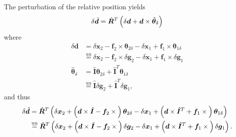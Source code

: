 \documentclass[10pt,fleqn,subeqn]{report}
\newcommand{\T}[1]{\bm{#1}}
\newcommand{\TT}[1]{\bm{#1}}
\newcommand{\equu}{\overset{\text{uu}}{=}}
\begin{document}
The perturbation of the relative position yields
\begin{equation}
	\delta\tilde{\T{d}} = \hat{\TT{R}}^T \plbr{
		\delta\T{d} + \T{d} \times \hat{\T{\theta}}_{\delta}
	}
\end{equation}
where
\begin{subequations}
\begin{align}
	\delta\T{d}
	&= \delta\T{x}_2 - \T{f}_2 \times \T{\theta}_{2\delta}
		- \delta\T{x}_1 + \T{f}_1 \times \T{\theta}_{1\delta}
		\nonumber \\
	&\equu \delta\T{x}_2 - \T{f}_2 \times \delta\T{g}_2
		- \delta\T{x}_1 + \T{f}_1 \times \delta\T{g}_1
	\\
	\hat{\T{\theta}}_{\delta}
	&= \hat{\TT{I}} \T{\theta}_{2\delta} + \hat{\TT{I}}^T \T{\theta}_{1\delta}
		\nonumber \\
	&\equu \hat{\TT{I}} \delta\T{g}_2 + \hat{\TT{I}}^T \delta\T{g}_1 ,
\end{align}
\end{subequations}
and thus
\begin{align}
	\delta\tilde{\T{d}} 
	&= \hat{\TT{R}}^T \plbr{
		\delta\T{x}_2
		+ \plbr{
			\T{d}\times\hat{\TT{I}}
			- \T{f}_2 \times{}
		} \T{\theta}_{2\delta}
		- \delta\T{x}_1
		+ \plbr{
			\T{d}\times\hat{\TT{I}}^T
			+ \T{f}_1 \times{}
		} \T{\theta}_{1\delta}
	}
	\nonumber \\
	&\equu \hat{\TT{R}}^T \plbr{
		\delta\T{x}_2
		+ \plbr{
			\T{d}\times\hat{\TT{I}}
			- \T{f}_2 \times{}
		} \delta\T{g}_2
		- \delta\T{x}_1
		+ \plbr{
			\T{d}\times\hat{\TT{I}}^T
			+ \T{f}_1 \times{}
		} \delta\T{g}_1
	}
	.
\end{align}
\end{document}

